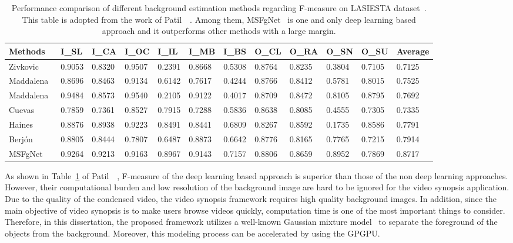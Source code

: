 \documentclass[11pt]{hyu_thesis}
\begin{document}
\begin{table}
	\centering
	\begin{tabular}{llllllllllll}
		\hline\hline
		Methods & I\_SL & I\_CA & I\_OC & I\_IL & I\_MB & I\_BS & O\_CL & O\_RA & O\_SN & O\_SU & Average \\
		\hline\hline
		Zivkovic~\cite{Zivkovic2006} & 0.9053  & 0.8320 & 0.9507 & 0.2391 & 0.8668 & 0.5308 & 0.8764 & 0.8235 & 0.3804 & 0.7105 & 0.7125 \\
		\hline
		Maddalena~\cite{maddalena2008self} & 0.8696 & 0.8463 & 0.9134 & 0.6142 & 0.7617 & 0.4244 & 0.8766 & 0.8412 & 0.5781 & 0.8015 & 0.7525 \\
		\hline
		Maddalena~\cite{maddalena2012sobs} & 0.9484 & 0.8573 & 0.9540 & 0.2105 & 0.9122 & 0.4017 & 0.8709 & 0.8472 & 0.8105 & 0.8795 & 0.7692 \\
		\hline
		Cuevas~\cite{cuevas2013improved} & 0.7859 & 0.7361 & 0.8527 & 0.7915 & 0.7288 & 0.5836 & 0.8638 & 0.8085 & 0.4555 & 0.7305 & 0.7335 \\
		\hline
		Haines~\cite{haines2014background} & 0.8876 & 0.8938 & 0.9223 & 0.8491 & 0.8441 & 0.6809 & 0.8267 & 0.8592 & 0.1735 & 0.8586 & 0.7791 \\
		\hline
		Berj{\'o}n~\cite{berjon2018real} & 0.8805 & 0.8444 & 0.7807 & 0.6487 & 0.8873 & 0.6642 & 0.8776 & 0.8165 & 0.7765 & 0.7215 & 0.7914 \\
		\hline
		MSFgNet~\cite{Patil2018} & 0.9264 & 0.9213 & 0.9163 & 0.8967 & 0.9143 & 0.7157 & 0.8806 & 0.8659 & 0.8952 & 0.7869 & 0.8717 \\
		\hline
	\end{tabular}
	\caption{Performance comparison of different background estimation methods regarding F-measure on LASIESTA dataset~\cite{cuevas2016labeled}. This table is adopted from the work of Patil~\etal~\cite{Patil2018}. Among them, MSFgNet~\cite{Patil2018} is one and only deep learning based approach and it outperforms other methods with a large margin.}
	\label{tb:bg_fmeasure}
\end{table}
As shown in Table~\ref{tb:bg_fmeasure} of Patil~\etal~\cite{Patil2018}, F-measure of the deep learning based approach is superior than those of the non deep learning approaches. However, their computational burden and low resolution of the background image are hard to be ignored for the video synopsis application. Due to the quality of the condensed video, the video synopsis framework requires high quality background images. In addition, since the main objective of video synopsis is to make users browse videos quickly, computation time is one of the most important things to consider. Therefore, in this dissertation, the proposed framework utilizes a well-known Gaussian mixture model~\cite{Zivkovic2004} to separate the foreground of the objects from the background. Moreover, this modeling process can be accelerated by using the GPGPU.
\end{document}
